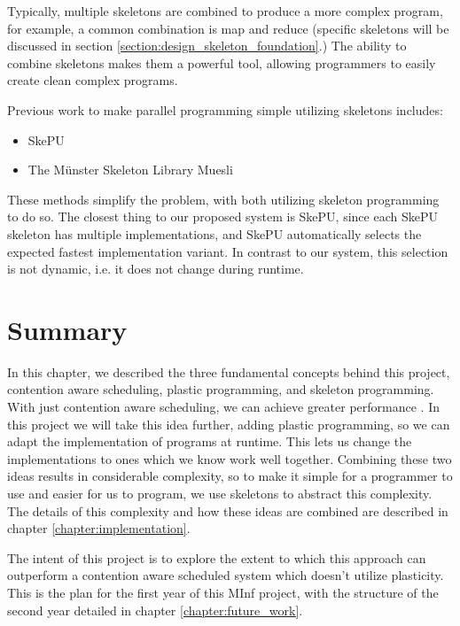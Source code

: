Typically, multiple skeletons are combined to produce a more complex program, for example, a common combination is map and reduce (specific skeletons will be discussed in section \ref{section:design_skeleton_foundation}.) The ability to combine skeletons makes them a powerful tool, allowing programmers to easily create clean complex programs.

Previous work to make parallel programming simple utilizing skeletons includes:

\begin{itemize}
	\item SkePU \cite{skepu}
	\item The M{\"u}nster Skeleton Library Muesli \cite{muesli}
\end{itemize}

These methods simplify the problem, with both utilizing skeleton programming to do so. The closest thing to our proposed system is SkePU, since each SkePU skeleton has multiple implementations, and SkePU automatically selects the expected fastest implementation variant. In contrast to our system, this selection is not dynamic, i.e. it does not change during runtime. 



\section{Summary}

In this chapter, we described the three fundamental concepts behind this project, contention aware scheduling, plastic programming, and skeleton programming. With just contention aware scheduling, we can achieve greater performance \cite{lira}. In this project we will take this idea further, adding plastic programming, so we can adapt the implementation of programs at runtime. This lets us change the implementations to ones which we know work well together. Combining these two ideas results in considerable complexity, so to make it simple for a programmer to use and easier for us to program, we use skeletons to abstract this complexity. The details of this complexity and how these ideas are combined are described in chapter \ref{chapter:implementation}.

The intent of this project is to explore the extent to which this approach can outperform a contention aware scheduled system which doesn't utilize plasticity. This is the plan for the first year of this MInf project, with the structure of the second year detailed in chapter \ref{chapter:future_work}.